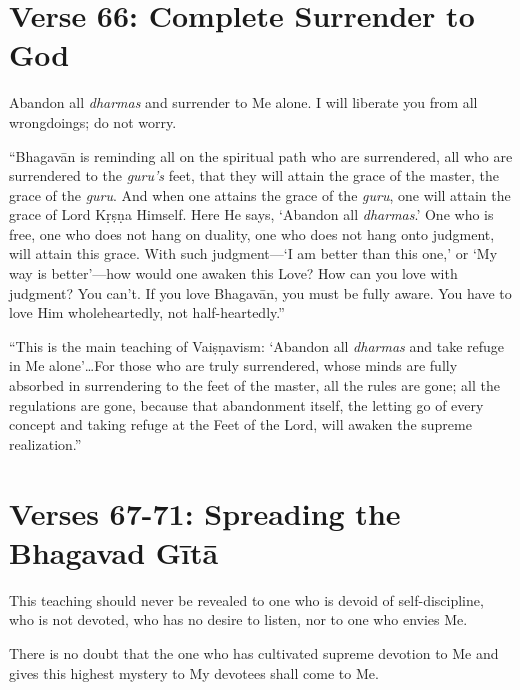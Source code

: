 \section{Verse 66: Complete Surrender to God}\label{sec-verse-66-complete-surrender-to-god}

{Abandon all \textit{dharmas} and surrender to Me alone. I will liberate you from all wrongdoings; do not worry.}

\enquote{Bhagavān is reminding all on the spiritual path who are surrendered, all who are surrendered to the \textit{guru’s} feet, that they will attain the grace of the master, the grace of the \textit{guru}. And when one attains the grace of the \textit{guru}, one will attain the grace of Lord Kṛṣṇa Himself. Here He says, \enquote{Abandon all \textit{dharmas}.} One who is free, one who does not hang on duality, one who does not hang onto judgment, will attain this grace. With such judgment---\enquote{I am better than this one,} or \enquote{My way is better}---how would one awaken this Love? How can you love with judgment? You can’t. If you love Bhagavān, you must be fully aware. You have to love Him wholeheartedly, not half-heartedly.}

\enquote{This is the main teaching of Vaiṣṇavism: \enquote{Abandon all \textit{dharmas} and take refuge in Me alone}\ldots For those who are truly surrendered, whose minds are fully absorbed in surrendering to the feet of the master, all the rules are gone; all the regulations are gone, because that abandonment itself, the letting go of every concept and taking refuge at the Feet of the Lord, will awaken the supreme realization.}

\section{Verses 67-71: Spreading the Bhagavad Gītā}\label{sec-verses-67-71-spreading-the-bhagavad-gita}

{This teaching should never be revealed to one who is devoid of self-discipline, who is not devoted, who has no desire to listen, nor to one who envies Me.}

{There is no doubt that the one who has cultivated supreme devotion to Me and gives this highest mystery to My devotees shall come to Me.}

